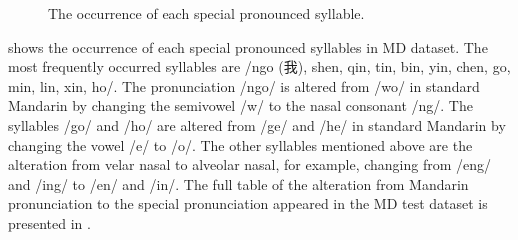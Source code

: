 \begin{figure}[ht!]
\caption{The occurrence of each special pronounced syllable.}
\label{fig:ch4:occurrence_special}
\end{figure}

 shows the occurrence of each special pronounced syllables in MD dataset. The most frequently occurred syllables are /ngo (我), shen, qin, tin, bin, yin, chen, go, min, lin, xin, ho/. The pronunciation /ngo/ is altered from /wo/ in standard Mandarin by changing the semivowel /w/ to the nasal consonant /ng/. The syllables /go/ and /ho/ are altered from /ge/ and /he/ in standard Mandarin by changing the vowel /e/ to /o/. The other syllables mentioned above are the alteration from velar nasal to alveolar nasal, for example, changing from /eng/ and /ing/ to /en/ and /in/. The full table of the alteration from Mandarin pronunciation to the special pronunciation appeared in the MD test dataset is presented in .

